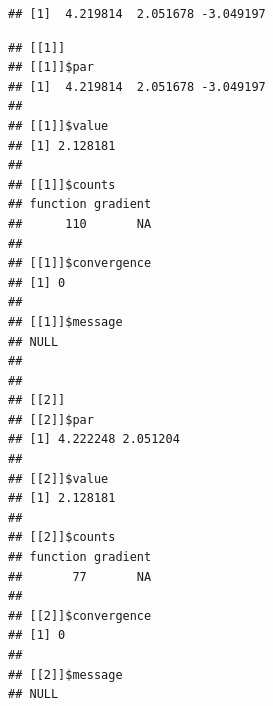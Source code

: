 \documentclass[]{book}
\newenvironment{Shaded}{\begin{snugshade}}{\end{snugshade}}
\newcommand{\ControlFlowTok}[1]{\textcolor[rgb]{0.13,0.29,0.53}{\textbf{#1}}}
\newcommand{\DataTypeTok}[1]{\textcolor[rgb]{0.13,0.29,0.53}{#1}}
\newcommand{\DecValTok}[1]{\textcolor[rgb]{0.00,0.00,0.81}{#1}}
\newcommand{\KeywordTok}[1]{\textcolor[rgb]{0.13,0.29,0.53}{\textbf{#1}}}
\newcommand{\NormalTok}[1]{#1}
\newcommand{\OperatorTok}[1]{\textcolor[rgb]{0.81,0.36,0.00}{\textbf{#1}}}
\newcommand{\StringTok}[1]{\textcolor[rgb]{0.31,0.60,0.02}{#1}}
\theoremstyle{definition}
\theoremstyle{definition}
\theoremstyle{definition}
\theoremstyle{remark}
\begin{document}
\begin{enumerate}
\begin{Shaded}
\end{Shaded}

\begin{verbatim}
## [1]  4.219814  2.051678 -3.049197
\end{verbatim}

\begin{Shaded}
\end{Shaded}

\begin{verbatim}
## [[1]]
## [[1]]$par
## [1]  4.219814  2.051678 -3.049197
## 
## [[1]]$value
## [1] 2.128181
## 
## [[1]]$counts
## function gradient 
##      110       NA 
## 
## [[1]]$convergence
## [1] 0
## 
## [[1]]$message
## NULL
## 
## 
## [[2]]
## [[2]]$par
## [1] 4.222248 2.051204
## 
## [[2]]$value
## [1] 2.128181
## 
## [[2]]$counts
## function gradient 
##       77       NA 
## 
## [[2]]$convergence
## [1] 0
## 
## [[2]]$message
## NULL
\end{verbatim}
\end{enumerate}
\end{document}
